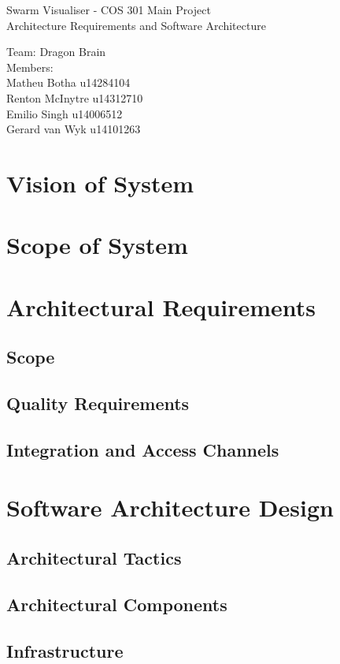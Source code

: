 \documentclass[11pt]{article}
\begin{document}
\begin{titlepage}

\begin{center}
\begin{huge}
Swarm Visualiser - COS 301 Main Project
\\
Architecture Requirements and Software Architecture
\begin{small}
Team: Dragon Brain
\\
Members:
\\
Matheu Botha u14284104
\\
Renton McInytre u14312710
\\
Emilio Singh u14006512
\\
Gerard van Wyk u14101263

\end{small}

\end{huge}
\end{center}
\end{titlepage}

\pagebreak

\tableofcontents

\pagebreak
\section{Vision of System}
\section{Scope of System}
\section{Architectural Requirements}
\subsection{Scope}
\subsection{Quality Requirements}
\subsection{Integration and Access Channels}

\section{Software Architecture Design}
\subsection{Architectural Tactics}
\subsection{Architectural Components}
\subsection{Infrastructure}
\end{document}
